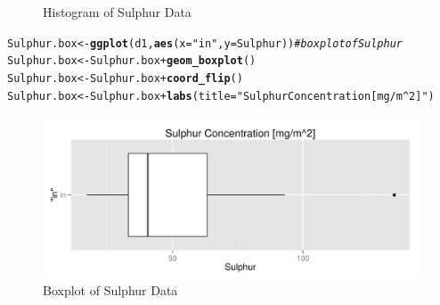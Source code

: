 \documentclass{article}\usepackage[]{graphicx}\usepackage[]{color}
\makeatletter
\def\maxwidth{ %
  \ifdim\Gin@nat@width>\linewidth
    \linewidth
  \else
    \Gin@nat@width
  \fi
}
\newcommand{\hlstr}[1]{\textcolor[rgb]{0.192,0.494,0.8}{#1}}%
\newcommand{\hlcom}[1]{\textcolor[rgb]{0.678,0.584,0.686}{\textit{#1}}}%
\newcommand{\hlopt}[1]{\textcolor[rgb]{0,0,0}{#1}}%
\newcommand{\hlstd}[1]{\textcolor[rgb]{0.345,0.345,0.345}{#1}}%
\newcommand{\hlkwb}[1]{\textcolor[rgb]{0.69,0.353,0.396}{#1}}%
\newcommand{\hlkwc}[1]{\textcolor[rgb]{0.333,0.667,0.333}{#1}}%
\newcommand{\hlkwd}[1]{\textcolor[rgb]{0.737,0.353,0.396}{\textbf{#1}}}%
\newenvironment{kframe}{%
 \def\at@end@of@kframe{}%
 \ifinner\ifhmode%
  \def\at@end@of@kframe{\end{minipage}}%
  \begin{minipage}{\columnwidth}%
 \fi\fi%
 \def\FrameCommand##1{\hskip\@totalleftmargin \hskip-\fboxsep
 \colorbox{shadecolor}{##1}\hskip-\fboxsep
     \hskip-\linewidth \hskip-\@totalleftmargin \hskip\columnwidth}%
 \MakeFramed {\advance\hsize-\width
   \@totalleftmargin\z@ \linewidth\hsize
   \@setminipage}}%
 {\par\unskip\endMakeFramed%
 \at@end@of@kframe}
\newenvironment{knitrout}{}{} %
\makeatother
\begin{document}
\begin{enumerate}
\begin{enumerate}
\begin{figure}[H]
\begin{center}
\begin{knitrout}
\end{knitrout}
\end{center} \vspace{-0.25in}\caption{Histogram of Sulphur Data} \end{figure}

\begin{knitrout}
\color{fgcolor}\begin{kframe}
\begin{alltt}
\hlstd{Sulphur.box} \hlkwb{<-} \hlkwd{ggplot}\hlstd{(d1,} \hlkwd{aes}\hlstd{(}\hlkwc{x} \hlstd{=} \hlstr{"in"}\hlstd{,} \hlkwc{y} \hlstd{= Sulphur))} \hlcom{# boxplot of Sulphur}
\hlstd{Sulphur.box} \hlkwb{<-} \hlstd{Sulphur.box} \hlopt{+} \hlkwd{geom_boxplot}\hlstd{()}
\hlstd{Sulphur.box} \hlkwb{<-} \hlstd{Sulphur.box} \hlopt{+} \hlkwd{coord_flip}\hlstd{()}
\hlstd{Sulphur.box} \hlkwb{<-} \hlstd{Sulphur.box} \hlopt{+} \hlkwd{labs}\hlstd{(}\hlkwc{title} \hlstd{=} \hlstr{"Sulphur Concentration [mg/m^2]"}\hlstd{)}
\end{alltt}
\end{kframe}
\end{knitrout}

\begin{figure}[H]  \begin{center}
\begin{knitrout}
\color{fgcolor}
\includegraphics[width=\maxwidth]{figure/2p_box} 

\end{knitrout}
\end{center} \vspace{-0.15in} \caption{Boxplot of Sulphur Data} \end{figure}


\end{enumerate}
\end{enumerate}
\end{document}
